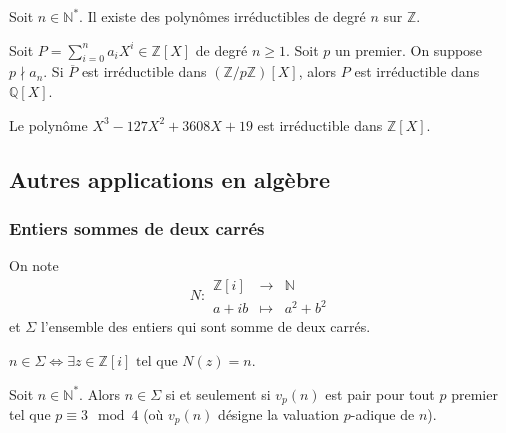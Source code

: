 
  \begin{application}
    Soit $n \in \mathbb{N}^*$. Il existe des polynômes irréductibles de degré $n$ sur $\mathbb{Z}$.
  \end{application}


  \begin{theorem}
    Soit $P = \sum_{i=0}^n a_i X^i \in \mathbb{Z}[X]$ de degré $n \geq 1$. Soit $p$ un premier. On suppose $p \nmid a_n$.
    \newpar
    Si $\overline{P}$ est irréductible dans $(\mathbb{Z}/p\mathbb{Z})[X]$, alors $P$ est irréductible dans $\mathbb{Q}[X]$.
  \end{theorem}

  \begin{example}
    Le polynôme $X^3-127X^2+3608X+19$ est irréductible dans $\mathbb{Z}[X]$.
  \end{example}

  \subsection{Autres applications en algèbre}

  \subsubsection{Entiers sommes de deux carrés}


  \begin{notation}
    On note \[ N :
    \begin{array}{ccc}
      \mathbb{Z}[i] &\rightarrow& \mathbb{N} \\
      a+ib &\mapsto& a^2 + b^2
    \end{array}
    \] et $\Sigma$ l'ensemble des entiers qui sont somme de deux carrés.
  \end{notation}

  \begin{remark}
    $n \in \Sigma \iff \exists z \in \mathbb{Z}[i] \text{ tel que } N(z)=n$.
  \end{remark}

  \begin{theorem}
    Soit $n \in \mathbb{N}^*$. Alors $n \in \Sigma$ si et seulement si $v_p(n)$ est pair pour tout $p$ premier tel que $p \equiv 3 \mod 4$ (où $v_p(n)$ désigne la valuation $p$-adique de $n$).
  \end{theorem}


